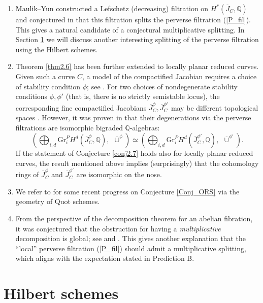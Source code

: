 \documentclass{pspum-l}
\theoremstyle{plain}
\theoremstyle{definition}
\theoremstyle{remark}
\newcommand{\BQ}{{\mathbb{Q}}}
\begin{document}
\begin{enumerate}
    \item[(1)] Maulik--Yun constructed a Lefschetz (decreasing) filtration on $H^*(\overline{J}_C, \BQ)$ and conjectured in \cite[Conjecture 2.17]{MY} that this filtration splits the perverse filtration (\ref{P_fil}). This gives a natural candidate of a conjectural multiplicative splitting. In Section \ref{sec3} we will discuss another interesting splitting of the perverse filtration using the Hilbert schemes.
    \item[(2)] Theorem \ref{thm2.6} has been further extended to locally planar reduced curves. Given such a curve $C$, a model of the compactified Jacobian requires a choice of stability condition $\phi$; see \cite{MeRV}. For two choices of nondegenerate stability conditions $\phi, \phi'$ (that is, there is no strictly semistable locus), the corresponding fine compactified Jacobians $\overline{J}^\phi_C, \overline{J}^{\phi'}_C$ may be different topological spaces \cite[Theorem B (iii)]{MeRV}. However, it was proven in \cite[Theorem 0.8]{BMSY2} that their degenerations via the perverse filtrations are isomorphic bigraded $\BQ$-algebras:
    \[
    \left( \bigoplus_{i,d} \mathrm{Gr}^P_iH^d(\overline{J}^\phi_C, \BQ),~~\overline{\cup}^\phi \right)  \simeq  \left( \bigoplus_{i,d} \mathrm{Gr}^P_iH^d(\overline{J}^{\phi'}_C, \BQ),~~\overline{\cup}^{\phi'} \right).
    \]
    If the statement of Conjecture \ref{conj2.7} holds also for locally planar reduced curves, the result mentioned above implies (surprisingly) that the cohomology rings of $\overline{J}^\phi_C$ and $\overline{J}^{\phi'}_C$ are isomorphic on the nose. 
    \item[(3)] We refer to \cite{KT} for some recent progress on Conjecture \ref{Conj_ORS} via the geometry of Quot schemes.
    \item[(4)] From the perspective of the decomposition theorem for an abelian fibration, it was conjectured that the obstruction for having a \emph{multiplicative} decomposition is global; see \cite{Sh} and \cite[Section 0.6.3]{BMSY2}. This gives another explanation that the ``local'' perverse filtration (\ref{P_fil}) should admit a multiplicative splitting, which aligns with the expectation stated in Prediction B.     
    \end{enumerate}









\section{Hilbert schemes}\label{sec3}
\end{document}
